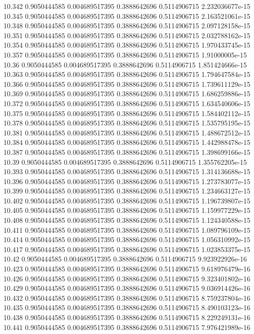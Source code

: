 {10.342 0.9050444585 0.004689517395 0.3888642696 0.5114906715 2.232036677e-15
10.345 0.9050444585 0.004689517395 0.3888642696 0.5114906715 2.163521061e-15
10.348 0.9050444585 0.004689517395 0.3888642696 0.5114906715 2.097128158e-15
10.351 0.9050444585 0.004689517395 0.3888642696 0.5114906715 2.032788162e-15
10.354 0.9050444585 0.004689517395 0.3888642696 0.5114906715 1.970433745e-15
10.357 0.9050444585 0.004689517395 0.3888642696 0.5114906715 1.91000005e-15
10.36 0.9050444585 0.004689517395 0.3888642696 0.5114906715 1.851424666e-15
10.363 0.9050444585 0.004689517395 0.3888642696 0.5114906715 1.794647584e-15
10.366 0.9050444585 0.004689517395 0.3888642696 0.5114906715 1.739611129e-15
10.369 0.9050444585 0.004689517395 0.3888642696 0.5114906715 1.686259886e-15
10.372 0.9050444585 0.004689517395 0.3888642696 0.5114906715 1.634540606e-15
10.375 0.9050444585 0.004689517395 0.3888642696 0.5114906715 1.584402112e-15
10.378 0.9050444585 0.004689517395 0.3888642696 0.5114906715 1.535795195e-15
10.381 0.9050444585 0.004689517395 0.3888642696 0.5114906715 1.488672512e-15
10.384 0.9050444585 0.004689517395 0.3888642696 0.5114906715 1.442988478e-15
10.387 0.9050444585 0.004689517395 0.3888642696 0.5114906715 1.398699166e-15
10.39 0.9050444585 0.004689517395 0.3888642696 0.5114906715 1.355762205e-15
10.393 0.9050444585 0.004689517395 0.3888642696 0.5114906715 1.314136688e-15
10.396 0.9050444585 0.004689517395 0.3888642696 0.5114906715 1.273783077e-15
10.399 0.9050444585 0.004689517395 0.3888642696 0.5114906715 1.234663127e-15
10.402 0.9050444585 0.004689517395 0.3888642696 0.5114906715 1.196739807e-15
10.405 0.9050444585 0.004689517395 0.3888642696 0.5114906715 1.159977229e-15
10.408 0.9050444585 0.004689517395 0.3888642696 0.5114906715 1.124340588e-15
10.411 0.9050444585 0.004689517395 0.3888642696 0.5114906715 1.089796109e-15
10.414 0.9050444585 0.004689517395 0.3888642696 0.5114906715 1.056310992e-15
10.417 0.9050444585 0.004689517395 0.3888642696 0.5114906715 1.023853375e-15
10.42 0.9050444585 0.004689517395 0.3888642696 0.5114906715 9.923922926e-16
10.423 0.9050444585 0.004689517395 0.3888642696 0.5114906715 9.618976479e-16
10.426 0.9050444585 0.004689517395 0.3888642696 0.5114906715 9.323401802e-16
10.429 0.9050444585 0.004689517395 0.3888642696 0.5114906715 9.036914426e-16
10.432 0.9050444585 0.004689517395 0.3888642696 0.5114906715 8.759237804e-16
10.435 0.9050444585 0.004689517395 0.3888642696 0.5114906715 8.490103123e-16
10.438 0.9050444585 0.004689517395 0.3888642696 0.5114906715 8.229249131e-16
10.441 0.9050444585 0.004689517395 0.3888642696 0.5114906715 7.976421989e-16
}
